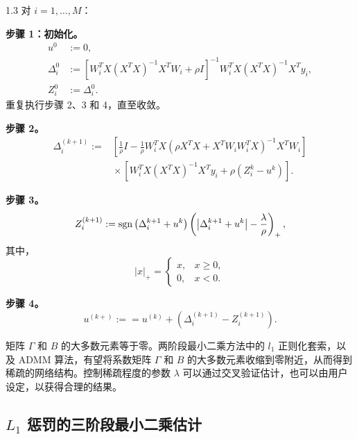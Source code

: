 \begin{bookalgorithm}{1.3}
对 $i=1,\ldots,M$：

\noindent\textbf{步骤 1：初始化。}
\[
 \begin{aligned}
 u^0&:=0,\\
 \Delta_i^0&:=
 \left[W_i^{T}X(X^{T}X)^{-1}X^{T}W_i+\rho I\right]^{-1}
 W_i^{T}X(X^{T}X)^{-1}X^{T}y_i,\\
 Z_i^0&:=\Delta_i^0.
 \end{aligned}
\]
重复执行步骤 2、3 和 4，直至收敛。

\noindent\textbf{步骤 2。}
\[
 \begin{aligned}
 \Delta_i^{(k+1)}
 :={}&\left[\frac1\rho I-\frac1\rho W_i^{T}X
       \left(\rho X^{T}X+X^{T}W_iW_i^{T}X\right)^{-1}X^{T}W_i\right]\\
 &{}\times\left[W_i^{T}X(X^{T}X)^{-1}X^{T}y_i
                       +\rho\left(Z_i^k-u^k\right)\right].
 \end{aligned}
\]

\noindent\textbf{步骤 3。}
\[
 Z_i^{(k+1)}
 :=\operatorname{sgn}\left(\Delta_i^{k+1}+u^k\right)
    \left(\left|\Delta_i^{k+1}+u^k\right|-\frac\lambda\rho\right)_+,
\]
其中，
\[
 |x|_+=
 \begin{cases}
  x,&x\geq0,\\
  0,&x<0.
 \end{cases}
\]

\noindent\textbf{步骤 4。}
\[
 u^{(k+)}\mathrel{:==}u^{(k)}
      +\left(\Delta_i^{(k+1)}-Z_i^{(k+1)}\right).
\]
\end{bookalgorithm}

矩阵 $\Gamma$ 和 $B$ 的大多数元素等于零。两阶段最小二乘方法中的 $l_1$ 正则化套索，以及 ADMM 算法，有望将系数矩阵 $\Gamma$ 和 $B$ 的大多数元素收缩到零附近，从而得到稀疏的网络结构。控制稀疏程度的参数 $\lambda$ 可以通过交叉验证估计，也可以由用户设定，以获得合理的结果。

\subsection{\texorpdfstring{$L_1$}{L1} 惩罚的三阶段最小二乘估计}
\label{sec:ch01b-l1-3sls}


